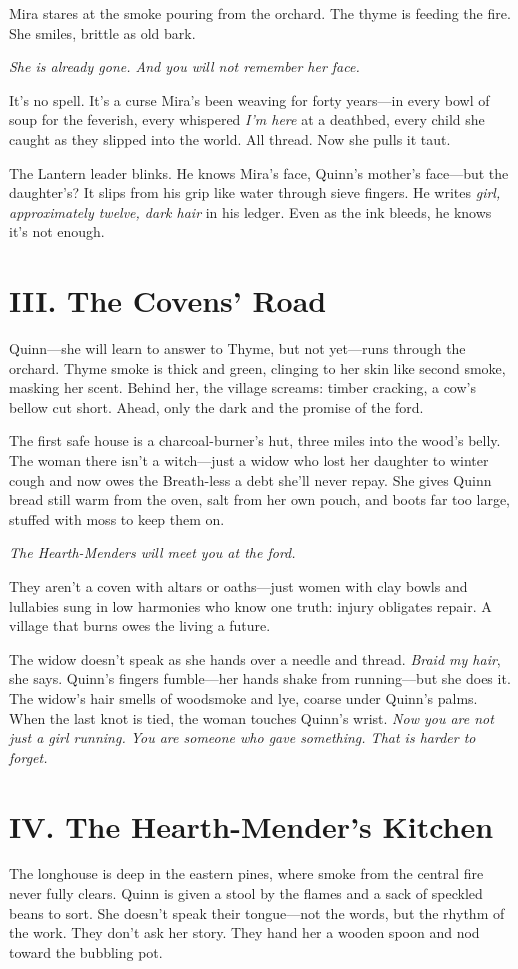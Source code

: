 \documentclass[11pt]{book}
\begin{document}
Mira stares at the smoke pouring from the orchard. The thyme is feeding the fire. She smiles, brittle as old bark.

\textit{She is already gone. And you will not remember her face.}

It's no spell. It's a curse Mira's been weaving for forty years---in every bowl of soup for the feverish, every whispered \textit{I'm here} at a deathbed, every child she caught as they slipped into the world. All thread. Now she pulls it taut.

The Lantern leader blinks. He knows Mira's face, Quinn's mother's face---but the daughter's? It slips from his grip like water through sieve fingers. He writes \textit{girl, approximately twelve, dark hair} in his ledger. Even as the ink bleeds, he knows it's not enough.

\section*{III. The Covens' Road}
Quinn---she will learn to answer to Thyme, but not yet---runs through the orchard. Thyme smoke is thick and green, clinging to her skin like second smoke, masking her scent. Behind her, the village screams: timber cracking, a cow's bellow cut short. Ahead, only the dark and the promise of the ford.

The first safe house is a charcoal-burner's hut, three miles into the wood's belly. The woman there isn't a witch---just a widow who lost her daughter to winter cough and now owes the Breath-less a debt she'll never repay. She gives Quinn bread still warm from the oven, salt from her own pouch, and boots far too large, stuffed with moss to keep them on.

\textit{The Hearth-Menders will meet you at the ford.}

They aren't a coven with altars or oaths---just women with clay bowls and lullabies sung in low harmonies who know one truth: injury obligates repair. A village that burns owes the living a future.

The widow doesn't speak as she hands over a needle and thread. \textit{Braid my hair}, she says. Quinn's fingers fumble---her hands shake from running---but she does it. The widow's hair smells of woodsmoke and lye, coarse under Quinn's palms. When the last knot is tied, the woman touches Quinn's wrist. \textit{Now you are not just a girl running. You are someone who gave something. That is harder to forget.}

\section*{IV. The Hearth-Mender's Kitchen}
The longhouse is deep in the eastern pines, where smoke from the central fire never fully clears. Quinn is given a stool by the flames and a sack of speckled beans to sort. She doesn't speak their tongue---not the words, but the rhythm of the work. They don't ask her story. They hand her a wooden spoon and nod toward the bubbling pot.
\end{document}
